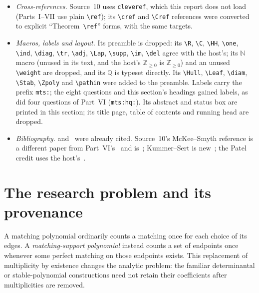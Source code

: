 \documentclass[11pt]{article}
\numberwithin{equation}{section}
\theoremstyle{definition}
\newcommand{\R}{\mathbb R}
\newcommand{\N}{\mathbb Z_{\geq0}}
\newcommand{\supp}{\operatorname{supp}}
\newcommand{\one}{\mathbf 1}
\newcommand{\C}{\mathbb C}
\newcommand{\diag}{\operatorname{diag}}
\newcommand{\ind}{\mathbf 1}
\newcommand{\HH}{\mathbb H}
\newcommand{\adj}{\operatorname{adj}}
\newcommand{\tr}{\operatorname{tr}}
\newcommand{\Lap}{\operatorname{Lap}}
\newcommand{\del}{\Delta}
\newcommand{\im}{\operatorname{Im}}
\newcommand{\Hull}{\operatorname{Hull}}
\newcommand{\Leaf}{\operatorname{Leaf}}
\newcommand{\diam}{\operatorname{diam}}
\newcommand{\Stab}{\mathcal S}
\newcommand{\Zpoly}{\mathcal Z}
\newcommand{\pathin}[2]{\mathring P_{#1#2}}
\begin{document}
\begin{itemize}[leftmargin=1.4em]
\texttt{article.tex}, became a table of Part~VI's sections
(Section~\ref{mts:app:source}). Its seven code, data and audit files keep
their delivered base names behind the prefix \texttt{10-marked-trees-}:
\texttt{marked\_trees.py}, \texttt{verify.py} and \texttt{build.sh} in
\nolinkurl{code/}; \texttt{requirements.txt} and the two files of its
\texttt{results/} directory, \texttt{run.log} and
\texttt{verification.json}, in \nolinkurl{data/}; and
\texttt{SOURCE\_AUDIT.md} at the report root. Merge notes give the shipped
names, and its reproduction commands are paraphrased with delivery names.
\item \emph{Cross-references.} Source~10 uses \texttt{cleveref}, which this
report does not load (Parts~I--VII use plain \verb|\ref|); its
\verb|\cref| and \verb|\Cref| references were converted to explicit
``Theorem~\verb|\ref|'' forms, with the same targets.
\item \emph{Macros, labels and layout.} Its preamble is dropped: its
\verb|\R|, \verb|\C|, \verb|\HH|, \verb|\one|, \verb|\ind|, \verb|\diag|,
\verb|\tr|, \verb|\adj|, \verb|\Lap|, \verb|\supp|, \verb|\im|, \verb|\del|
agree with the host's; its $\mathbb N$ macro (unused in its text, and
the host's $\N$ is $\mathbb Z_{\ge0}$) and an unused \verb|\weight| are
dropped, and its $\mathbb Q$ is typeset directly. Its \verb|\Hull|,
\verb|\Leaf|, \verb|\diam|, \verb|\Stab|, \verb|\Zpoly| and \verb|\pathin|
were added to the preamble. Labels carry the prefix \texttt{mts:}; the
eight questions and this section's headings gained labels, as did four
questions of Part~VI (\texttt{mts:hq:}). Its abstract and status box are
printed in this section; its title page, table of contents and running
head are dropped.
\item \emph{Bibliography.} \cite{COSW} and~\cite{Branden} were already
cited. Source~10's McKee--Smyth reference is a different paper from
Part~VI's~\cite{McKeeSmyth} and is~\cite{McKeeSmythIMRN}; Kummer--Sert is
new~\cite{KummerSert}; the Patel credit uses the host's~\cite{Patel}.
\end{itemize}

\section{The research problem and its provenance}\label{mts:sec:provenance}

A matching polynomial ordinarily counts a matching once for each choice of
its edges. A \emph{matching-support polynomial} instead counts a set of
endpoints once whenever some perfect matching on those endpoints exists.
This replacement of multiplicity by existence changes the analytic problem:
the familiar determinantal or stable-polynomial constructions need not
retain their coefficients after multiplicities are removed.
\end{document}
